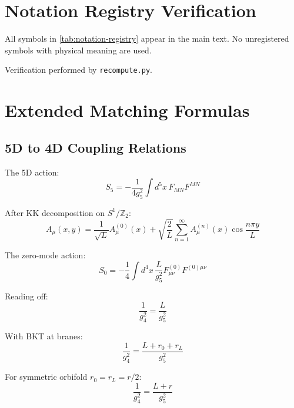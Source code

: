\documentclass[11pt,a4paper]{article}
\begin{document}
\section{Notation Registry Verification}
\label{app:notation-verify}

All symbols in \cref{tab:notation-registry} appear in the main text.
No unregistered symbols with physical meaning are used.

Verification performed by \texttt{recompute.py}.

\section{Extended Matching Formulas}
\label{app:extended}

\subsection{5D to 4D Coupling Relations}
\label{app:5d-4d}

The 5D action:
\begin{equation}
\label{eq:5d-action-app}
S_5 = -\frac{1}{4g_5^2}\int d^5x\, F_{MN}F^{MN}
\end{equation}

After KK decomposition on $S^1/\mathbb{Z}_2$:
\begin{equation}
\label{eq:kk-decomp-app}
A_\mu(x,y) = \frac{1}{\sqrt{L}}A_\mu^{(0)}(x) + \sqrt{\frac{2}{L}}\sum_{n=1}^{\infty}A_\mu^{(n)}(x)\cos\frac{n\pi y}{L}
\end{equation}

The zero-mode action:
\begin{equation}
\label{eq:zero-mode-action}
S_0 = -\frac{1}{4}\int d^4x\, \frac{L}{g_5^2} F_{\mu\nu}^{(0)}F^{(0)\mu\nu}
\end{equation}

Reading off:
\begin{equation}
\label{eq:g4-from-g5-app}
\frac{1}{g_4^2} = \frac{L}{g_5^2}
\end{equation}

With BKT at branes:
\begin{equation}
\label{eq:bkt-correction-app}
\frac{1}{g_4^2} = \frac{L + r_0 + r_L}{g_5^2}
\end{equation}

For symmetric orbifold $r_0 = r_L = r/2$:
\begin{equation}
\label{eq:symmetric-bkt}
\frac{1}{g_4^2} = \frac{L + r}{g_5^2}
\end{equation}
\end{document}
